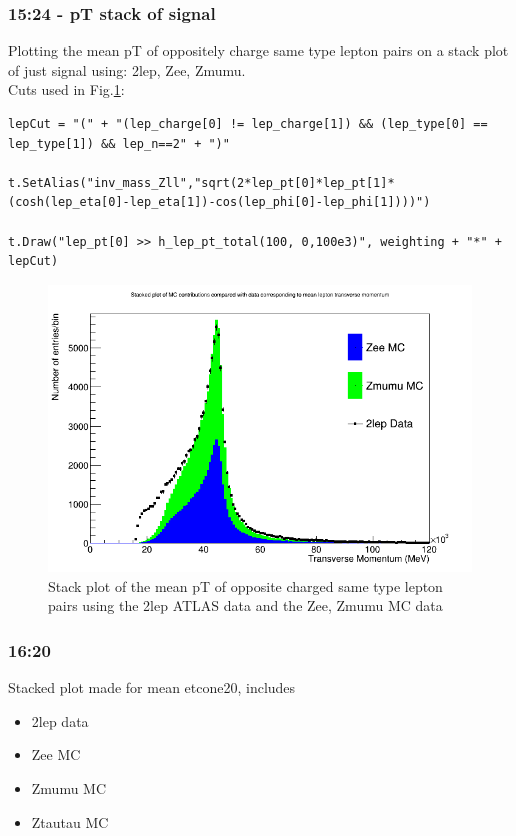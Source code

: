 \subsubsection*{15:24 - pT stack of signal}
Plotting the mean pT of oppositely charge same type lepton pairs on a stack plot of just signal using: 2lep, Zee, Zmumu.
\\
Cuts used in Fig.\ref{fig:15-24_16-02-21}:
\begin{lstlisting}
lepCut = "(" + "(lep_charge[0] != lep_charge[1]) && (lep_type[0] == lep_type[1]) && lep_n==2" + ")"

t.SetAlias("inv_mass_Zll","sqrt(2*lep_pt[0]*lep_pt[1]*(cosh(lep_eta[0]-lep_eta[1])-cos(lep_phi[0]-lep_phi[1])))")

t.Draw("lep_pt[0] >> h_lep_pt_total(100, 0,100e3)", weighting + "*" + lepCut)
\end{lstlisting}
\begin{figure}[h!]
    \centering
	\includegraphics[width=0.85\linewidth]{plots/16-02-2021/2lep-Zee-Zmumu-fast_op-c-pairs_PT_0-150GeV_16-02-21_15-24.png}
	\caption{Stack plot of the mean pT of opposite charged same type lepton pairs using the 2lep ATLAS data and the Zee, Zmumu MC data }\label{fig:15-24_16-02-21}
\end{figure}

\subsubsection*{16:20}
Stacked plot made for mean etcone20, includes
\begin{itemize}
    \item 2lep data
    \item Zee MC
    \item Zmumu MC
    \item Ztautau MC
\end{itemize}

